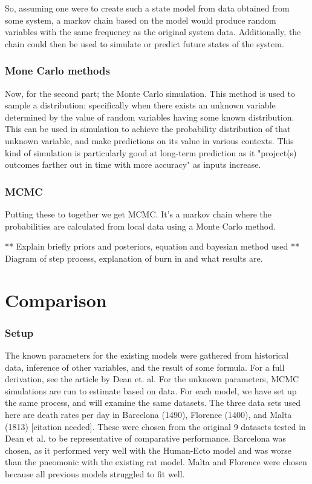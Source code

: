 \documentclass [letterpaper, 12pt] {article}
\begin{document}
So, assuming one were to create such a state model from data obtained from some system, a markov chain based on the model would produce random variables with the same frequency as the original system data. Additionally, the chain could then be used to simulate or predict future states of the system.

\subsubsection{Mone Carlo methods}
Now, for the second part; the Monte Carlo simulation. This method is used to sample a distribution: specifically when there exists an unknown variable determined by the value of random variables having some known distribution. \cite{holmes} This can be used in simulation to achieve the probability distribution of that unknown variable, and make predictions on its value in various contexts. This kind of simulation is particularly good at long-term prediction as it "project(s) outcomes farther out in time with more accuracy" as inputs increase. \cite{ibm_cloud_2020}

\subsubsection{MCMC}

Putting these to together we get MCMC. It's a markov chain where the probabilities are calculated from local data using a Monte Carlo method.

** Explain briefly priors and posteriors, equation and bayesian method used
** Diagram of step process, explanation of burn in and what results are.



\newpage

\section {Comparison}

\subsubsection{Setup}

The known parameters for the existing models were gathered from historical data, inference of other variables, and the result of some formula. For a full derivation, see the article by Dean et. al. \cite{Dean1304}
For the unknown parameters, MCMC simulations are run to estimate based on data. For each model, we have set up the same process, and will examine the same datasets. The three data sets used here are death rates per day in Barcelona (1490), Florence (1400), and Malta (1813) [citation needed]. These were chosen from the original 9 datasets tested in Dean et al. to be representative of comparative performance. Barcelona was chosen, as it performed very well with the Human-Ecto model and was worse than the pneomonic with the existing rat model. Malta and Florence were chosen because all previous models struggled to fit well.
\end{document}

